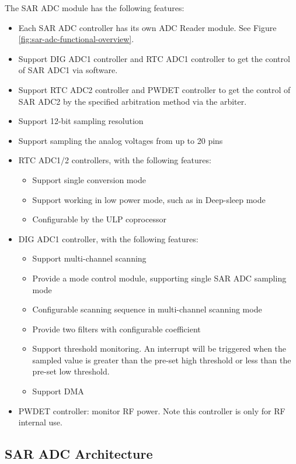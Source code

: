 \documentclass[main\_\_EN.tex]{subfiles}
\begin{document}
The SAR ADC module has the following features:
\begin{itemize}
\item Each SAR ADC controller has its own ADC Reader module. See Figure \ref{fig:sar-adc-functional-overview}.
\item Support DIG ADC1 controller and RTC ADC1 controller to get the control of SAR ADC1 via software.
\item Support RTC ADC2 controller and PWDET controller to get the control of SAR ADC2 by the specified arbitration method via the arbiter.
\item Support 12-bit sampling resolution
\item Support sampling the analog voltages from up to 20 pins
\item RTC ADC1/2 controllers, with the following features:
    \begin{itemize}
        \item Support single conversion mode
        \item Support working in low power mode, such as in Deep-sleep mode
        \item Configurable by the ULP coprocessor
    \end{itemize}
\item DIG ADC1 controller, with the following features:
    \begin{itemize}
        \item Support multi-channel scanning
        \item Provide a mode control module, supporting single SAR ADC sampling mode
        \item Configurable scanning sequence in multi-channel scanning mode
        \item Provide two filters with configurable coefficient
        \item Support threshold monitoring. An interrupt will be triggered when the sampled value is greater than the pre-set high threshold or less than the pre-set low threshold.
        \item Support DMA
    \end{itemize}
\item PWDET controller: monitor RF power. Note this controller is only for RF internal use.
\end{itemize}


\subsection{SAR ADC Architecture}
\end{document}
